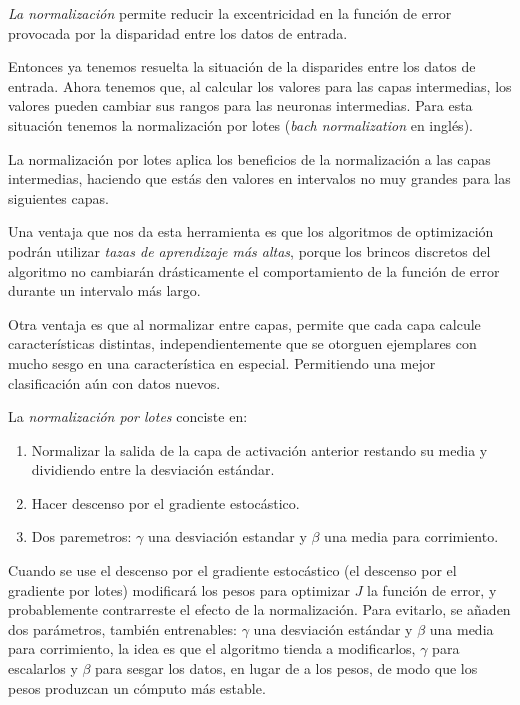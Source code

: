 \begin{definition}
 \emph{La normalización} permite reducir la excentricidad en la función de error provocada por la disparidad entre los datos de entrada.
\end{definition}
  
 Entonces ya tenemos resuelta la situación de la disparides entre los datos de entrada. Ahora tenemos que, al calcular los valores para las capas intermedias, los valores pueden cambiar sus rangos para las neuronas intermedias. Para esta situación tenemos la normalización por lotes (\emph{bach normalization} en inglés).
 
La normalización por lotes aplica los beneficios de la normalización a las capas intermedias, haciendo que estás den valores en intervalos no muy grandes para las siguientes capas.

Una ventaja que nos da esta herramienta es que los algoritmos de optimización podrán utilizar \textit{tazas de aprendizaje más altas}, porque los brincos discretos del algoritmo no cambiarán drásticamente el comportamiento de la función de error durante un intervalo más largo.

Otra ventaja es que al normalizar entre capas, permite que cada capa calcule características distintas, independientemente que se otorguen ejemplares con mucho sesgo en una característica en especial. Permitiendo una mejor clasificación aún con datos nuevos. 

\begin{definition}
 La \emph{normalización por lotes} conciste en: 
 \begin{enumerate}
  \item  Normalizar la salida de la capa de activación anterior restando su media y dividiendo entre la desviación estándar.
  \item Hacer descenso por el gradiente estocástico.
  \item Dos paremetros: $\gamma$ una desviación estandar y $\beta$ una media para corrimiento.
 \end{enumerate}
\end{definition}

Cuando se use el descenso por el gradiente estocástico (el descenso por el gradiente por lotes) modificará los pesos para optimizar $J$ la función de error, y probablemente contrarreste el efecto de la normalización.
Para evitarlo, se añaden dos parámetros, también entrenables: $\gamma$ una desviación estándar y $\beta$ una media para corrimiento, la idea es que el algoritmo tienda a
modificarlos, $\gamma$ para escalarlos y $\beta$ para sesgar los datos, en lugar de a los pesos, de modo que los pesos produzcan un cómputo más estable.

